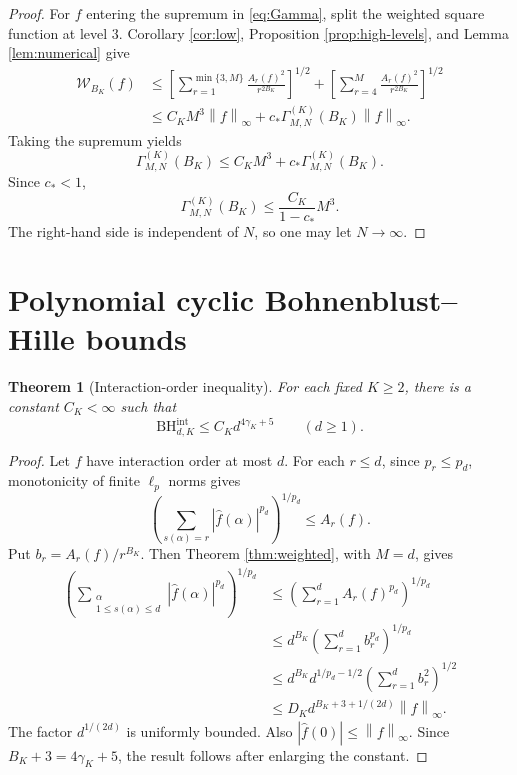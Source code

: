 \documentclass[11pt]{article}
\newtheorem{theorem}{Theorem}[section]
\theoremstyle{definition}
\theoremstyle{remark}
\newcommand{\wh}{\widehat}
\newcommand{\norm}[1]{\left\lVert #1\right\rVert}
\newcommand{\abs}[1]{\left\lvert #1\right\rvert}
\newcommand{\BH}{\mathrm{BH}}
\begin{document}
\begin{proof}
For $f$ entering the supremum in \eqref{eq:Gamma}, split the weighted square
function at level $3$.  Corollary \ref{cor:low}, Proposition
\ref{prop:high-levels}, and Lemma \ref{lem:numerical} give
\begin{align*}
 \mathcal W_{B_K}(f)
 &\le
 \left[
  \sum_{r=1}^{\min\{3,M\}}
  \frac{A_r(f)^2}{r^{2B_K}}
 \right]^{1/2}
 +
 \left[
  \sum_{r=4}^M
  \frac{A_r(f)^2}{r^{2B_K}}
 \right]^{1/2}\\
 &\le C_KM^3\norm f_\infty
 +c_*\Gamma^{(K)}_{M,N}(B_K)\norm f_\infty.
\end{align*}
Taking the supremum yields
\[
 \Gamma^{(K)}_{M,N}(B_K)
 \le C_KM^3+c_*\Gamma^{(K)}_{M,N}(B_K).
\]
Since $c_*<1$,
\[
 \Gamma^{(K)}_{M,N}(B_K)
 \le\frac{C_K}{1-c_*}M^3.
\]
The right-hand side is independent of $N$, so one may let $N\to\infty$.
\end{proof}

\section{Polynomial cyclic Bohnenblust--Hille bounds}

\begin{theorem}[Interaction-order inequality]
\label{thm:interaction}
For each fixed $K\ge2$, there is a constant $C_K<\infty$ such that
\begin{equation}
\label{eq:interaction-final}
 \BH^{\mathrm{int}}_{d,K}
 \le C_Kd^{4\gamma_K+5}
 \qquad(d\ge1).
\end{equation}
\end{theorem}

\begin{proof}
Let $f$ have interaction order at most $d$.  For each $r\le d$, since
$p_r\le p_d$, monotonicity of finite $\ell_p$ norms gives
\[
 \left(
  \sum_{s(\alpha)=r}\abs{\wh f(\alpha)}^{p_d}
 \right)^{1/p_d}
 \le A_r(f).
\]
Put $b_r=A_r(f)/r^{B_K}$.  Then Theorem \ref{thm:weighted}, with $M=d$,
gives
\begin{align*}
 \left(
  \sum_{\substack{\alpha\\1\le s(\alpha)\le d}}
  \abs{\wh f(\alpha)}^{p_d}
 \right)^{1/p_d}
 &\le\left(\sum_{r=1}^d A_r(f)^{p_d}\right)^{1/p_d}\\
 &\le d^{B_K}
 \left(\sum_{r=1}^d b_r^{p_d}\right)^{1/p_d}\\
 &\le d^{B_K}d^{1/p_d-1/2}
 \left(\sum_{r=1}^d b_r^2\right)^{1/2}\\
 &\le D_Kd^{B_K+3+1/(2d)}\norm f_\infty.
\end{align*}
The factor $d^{1/(2d)}$ is uniformly bounded.  Also
$\abs{\wh f(0)}\le\norm f_\infty$.  Since $B_K+3=4\gamma_K+5$, the result
follows after enlarging the constant.
\end{proof}
\end{document}
